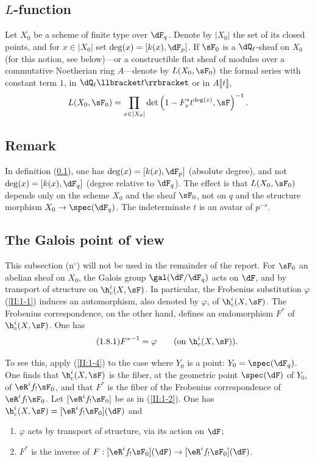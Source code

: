 \documentclass[oneside]{book}
\begin{document}
\subsection{\texorpdfstring{$L$}{L}-function}\label{II:1-6}

Let $X_0$ be a scheme of finite type over $\dF_q$. Denote by $|X_0|$ the set
of its closed points, and for $x\in |X_0|$ set
$\deg(x)=[k(x),\dF_p]$. If $\sF_0$ is a $\dQ_\ell$-sheaf on $X_0$ (for this
notion, see below)---or a constructible flat sheaf of modules over a
commutative Noetherian ring $A$---denote by $L(X_0,\sF_0)$ the formal series
with constant term $1$, in $\dQ_\ell\llbracket t\rrbracket$ or in
$A\llbracket t\rrbracket$,
\[
  L(X_0,\sF_0) = \prod_{x\in|X_0|} \det\left(1-F_x^* t^{\deg(x)},\sF\right)^{-1} \text{.}
\]






\subsection{Remark}\label{II:1-7}

In definition (\ref{II:1-6}), one has $\deg(x)=[k(x),\dF_p]$ (absolute
degree), and not $\deg(x)=[k(x),\dF_q]$ (degree relative to $\dF_q$). The
effect is that $L(X_0,\sF_0)$ depends only on the scheme $X_0$ and the sheaf
$\sF_0$, not on $q$ and the structure morphism
$X_0\to\spec(\dF_q)$. The indeterminate $t$ is an avatar of $p^{-s}$.






\subsection{The Galois point of view}\label{II:1-8}

This subsection (n$^\circ$) will not be used in the remainder of the report. For $\sF_0$
an abelian sheaf on $X_0$, the Galois group $\gal(\dF/\dF_q)$ acts on
$\dF$, and by transport of structure on $\h_c^i(X,\sF)$. In particular, the
Frobenius substitution $\varphi$ (\ref{II:1-1}) induces an automorphism, also
denoted by $\varphi$, of $\h_c^i(X,\sF)$. The Frobenius correspondence, on the
other hand, defines an endomorphism $F^*$ of $\h_c^i(X,\sF)$. One has
\begin{equation*}\tag{1.8.1}\label{II:eq:1-8-1}
  {F^*}^{-1} = \varphi \qquad \text{(on $\h_c^i(X,\sF)$).}
\end{equation*}

To see this, apply (\ref{II:1-4}) to the case where $Y_0$ is a point:
$Y_0=\spec(\dF_q)$. One finds that $\h_c^i(X,\sF)$ is the fiber, at the
geometric point $\spec(\dF)$ of $Y_0$, of $\eR^i f_! \sF_0$, and that $F^*$
is the fiber of the Frobenius correspondence of $\eR^i f_!\sF_0$. Let
$[\eR^i f_! \sF_0]$ be as in (\ref{II:1-2}). One has
$\h_c^i(X,\sF) = [\eR^i f_!\sF_0](\dF)$ and
\begin{enumerate}[\indent a)]
  \item $\varphi$ acts by transport of structure, via its action on $\dF$;
  \item $F^*$ is the inverse of
    $F:[\eR^i f_!\sF_0](\dF) \to [\eR^i f_!\sF_0](\dF)$.
\end{enumerate}
\end{document}
